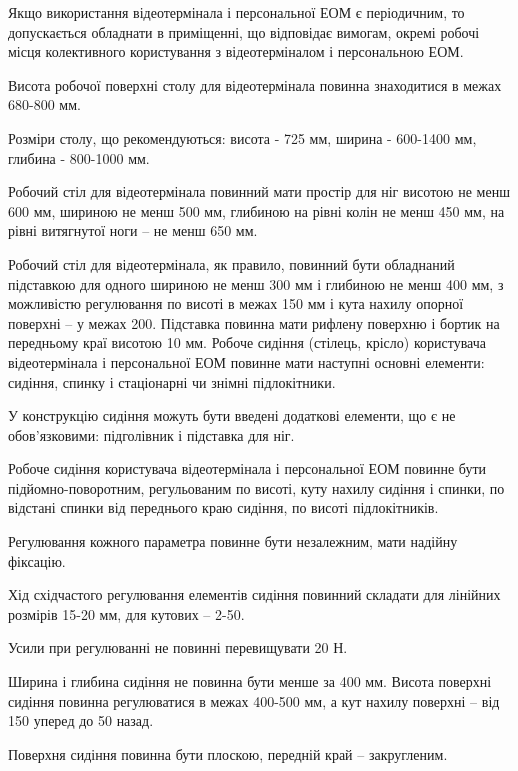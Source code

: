 \documentclass[simple,a4paper,14pt,ukrainian,utf8]{eskdtext}
\begin{document}
\begin{appendices}
                Якщо використання відеотермінала і персональної ЕОМ є періодичним, то допускається обладнати в приміщенні, що відповідає вимогам, окремі робочі місця колективного користування з відеотерміналом і персональною ЕОМ.

                Висота робочої поверхні столу для відеотермінала повинна знаходитися в межах 680-800 мм.

                Розміри столу, що рекомендуються: висота - 725 мм, ширина - 600-1400 мм, глибина - 800-1000 мм.

                Робочий стіл для відеотермінала повинний мати простір для ніг висотою не менш 600 мм, шириною не менш 500 мм, глибиною на рівні колін не менш 450 мм, на рівні витягнутої ноги -- не менш 650 мм.

                Робочий стіл для відеотермінала, як правило, повинний бути обладнаний підставкою для одного шириною не менш 300 мм і глибиною не менш 400 мм, з можливістю регулювання по висоті в межах 150 мм і кута нахилу опорної поверхні -- у межах 200. Підставка повинна мати рифлену поверхню і бортик на передньому краї висотою 10 мм. Робоче сидіння (стілець, крісло) користувача відеотермінала і персональної ЕОМ повинне мати наступні основні елементи: сидіння, спинку і стаціонарні чи знімні підлокітники.

                У конструкцію сидіння можуть бути введені додаткові елементи, що є не обов'язковими: підголівник і підставка для ніг.

                Робоче сидіння користувача відеотермінала і персональної ЕОМ повинне бути підйомно-поворотним, регульованим по висоті, куту нахилу сидіння і спинки, по відстані спинки від переднього краю сидіння, по висоті підлокітників.

                Регулювання кожного параметра повинне бути незалежним, мати надійну фіксацію.

                Хід східчастого регулювання елементів сидіння повинний складати для лінійних розмірів 15-20 мм, для кутових -- 2-50.

                Усили при регулюванні не повинні перевищувати 20 Н.

                Ширина і глибина сидіння не повинна бути менше за 400 мм. Висота поверхні сидіння повинна регулюватися в межах 400-500 мм, а кут нахилу поверхні -- від 150 уперед до 50 назад.

                Поверхня сидіння повинна бути плоскою, передній край -- закругленим.


\end{appendices}
\end{document}
